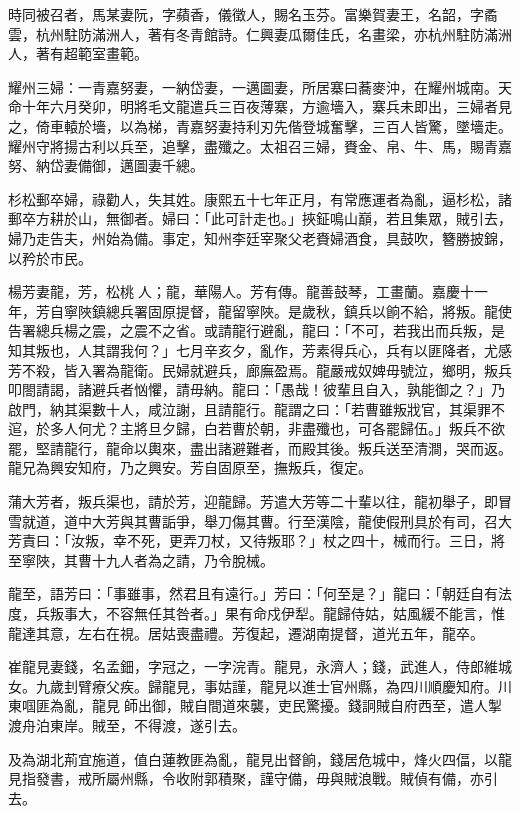 \begin{pinyinscope}
時同被召者，馬某妻阮，字蘋香，儀徵人，賜名玉芬。富樂賀妻王，名韶，字矞雲，杭州駐防滿洲人，著有冬青館詩。仁興妻瓜爾佳氏，名畫梁，亦杭州駐防滿洲人，著有超範室畫範。

耀州三婦：一青嘉努妻，一納岱妻，一邁圖妻，所居寨曰蕎麥沖，在耀州城南。天命十年六月癸卯，明將毛文龍遣兵三百夜薄寨，方逾墻入，寨兵未即出，三婦者見之，倚車轅於墻，以為梯，青嘉努妻持利刃先偕登城奮擊，三百人皆驚，墜墻走。耀州守將揚古利以兵至，追擊，盡殲之。太祖召三婦，賚金、帛、牛、馬，賜青嘉努、納岱妻備御，邁圖妻千總。

杉松郵卒婦，祿勸人，失其姓。康熙五十七年正月，有常應運者為亂，逼杉松，諸郵卒方耕於山，無御者。婦曰：「此可計走也。」挾鉦鳴山巔，若且集眾，賊引去，婦乃走告夫，州始為備。事定，知州李廷宰聚父老賚婦酒食，具鼓吹，簪勝披錦，以矜於市民。

楊芳妻龍，芳，松桃人；龍，華陽人。芳有傳。龍善鼓琴，工畫蘭。嘉慶十一年，芳自寧陜鎮總兵署固原提督，龍留寧陜。是歲秋，鎮兵以餉不給，將叛。龍使告署總兵楊之震，之震不之省。或請龍行避亂，龍曰：「不可，若我出而兵叛，是知其叛也，人其謂我何？」七月辛亥夕，亂作，芳素得兵心，兵有以匪降者，尤感芳不殺，皆入署為龍衛。民婦就避兵，廊廡盈焉。龍嚴戒奴婢毋號泣，鄉明，叛兵叩閤請謁，諸避兵者忷懼，請毋納。龍曰：「愚哉！彼輩且自入，孰能御之？」乃啟門，納其渠數十人，咸泣謝，且請龍行。龍謂之曰：「若曹雖叛戕官，其渠罪不逭，於多人何尤？主將旦夕歸，白若曹於朝，非盡殲也，可各罷歸伍。」叛兵不欲罷，堅請龍行，龍命以輿來，盡出諸避難者，而殿其後。叛兵送至清澗，哭而返。龍兄為興安知府，乃之興安。芳自固原至，撫叛兵，復定。

蒲大芳者，叛兵渠也，請於芳，迎龍歸。芳遣大芳等二十輩以往，龍初舉子，即冒雪就道，道中大芳與其曹詬爭，舉刀傷其曹。行至漢陰，龍使假刑具於有司，召大芳責曰：「汝叛，幸不死，更弄刀杖，又待叛耶？」杖之四十，械而行。三日，將至寧陜，其曹十九人者為之請，乃令脫械。

龍至，語芳曰：「事雖事，然君且有遠行。」芳曰：「何至是？」龍曰：「朝廷自有法度，兵叛事大，不容無任其咎者。」果有命戍伊犁。龍歸侍姑，姑風緩不能言，惟龍達其意，左右在視。居姑喪盡禮。芳復起，遷湖南提督，道光五年，龍卒。

崔龍見妻錢，名孟鈿，字冠之，一字浣青。龍見，永濟人；錢，武進人，侍郎維城女。九歲刲臂療父疾。歸龍見，事姑謹，龍見以進士官州縣，為四川順慶知府。川東啯匪為亂，龍見師出御，賊自間道來襲，吏民驚擾。錢詗賊自府西至，遣人掣渡舟泊東岸。賊至，不得渡，遂引去。

及為湖北荊宜施道，值白蓮教匪為亂，龍見出督餉，錢居危城中，烽火四偪，以龍見指發書，戒所屬州縣，令收附郭積聚，謹守備，毋與賊浪戰。賊偵有備，亦引去。


\end{pinyinscope}
